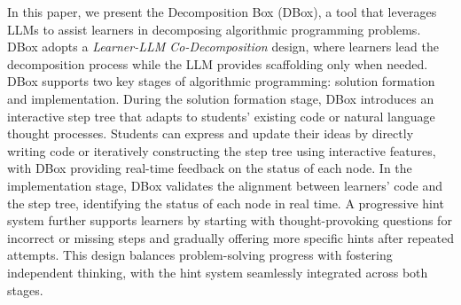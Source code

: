 



In this paper, we present the Decomposition Box (DBox), a tool that leverages LLMs to assist learners in decomposing algorithmic programming problems. DBox adopts a \emph{Learner-LLM Co-Decomposition} design, where learners lead the decomposition process while the LLM provides scaffolding only when needed. DBox supports two key stages of algorithmic programming: solution formation and implementation. During the solution formation stage, DBox introduces an interactive step tree that adapts to students' existing code or natural language thought processes. Students can express and update their ideas by directly writing code or iteratively constructing the step tree using interactive features, with DBox providing real-time feedback on the status of each node. In the implementation stage, DBox validates the alignment between learners' code and the step tree, identifying the status of each node in real time. A progressive hint system further supports learners by starting with thought-provoking questions for incorrect or missing steps and gradually offering more specific hints after repeated attempts. This design balances problem-solving progress with fostering independent thinking, with the hint system seamlessly integrated across both stages.



